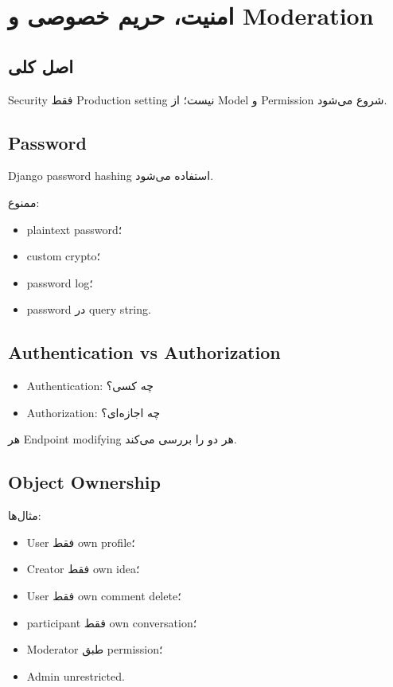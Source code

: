 
\chapter{امنیت، حریم خصوصی و Moderation}

\section{اصل کلی}

Security فقط Production setting نیست؛ از Model و Permission شروع می‌شود.

\section{Password}

Django password hashing استفاده می‌شود.

ممنوع:
\begin{itemize}
  \item plaintext password؛
  \item custom crypto؛
  \item password log؛
  \item password در query string.
\end{itemize}

\section{Authentication vs Authorization}

\begin{itemize}
  \item Authentication: چه کسی؟
  \item Authorization: چه اجازه‌ای؟
\end{itemize}

هر Endpoint modifying هر دو را بررسی می‌کند.

\section{Object Ownership}

مثال‌ها:
\begin{itemize}
  \item User فقط own profile؛
  \item Creator فقط own idea؛
  \item User فقط own comment delete؛
  \item participant فقط own conversation؛
  \item Moderator طبق permission؛
  \item Admin unrestricted.
\end{itemize}

